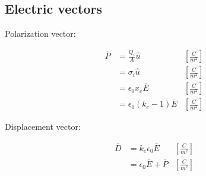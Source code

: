 \documentclass[letterpaper]{article}
\newcommand{\divline}{\noindent\makebox[\linewidth]{\rule{\textwidth}{0.4pt}}}
\begin{document}
    \divline
    \begin{multicols}{2}
        \section{Electric vectors}

        Polarization vector:

        \begin{align*}
            \overline{P} &= \frac{Q_{i}}{A} \hat{u} &\left[ \frac{C}{m^{2}} \right] \\
                &= \sigma_{i} \hat{u} &\left[ \frac{C}{m^{2}} \right] \\
                &= \epsilon_{0} x_{e} \overline{E} &\left[ \frac{C}{m^{2}} \right] \\
                &= \epsilon_{0}(k_{e} - 1) \overline{E} &\left[ \frac{C}{m^{2}} \right]
        \end{align*}

        Displacement vector:

        \begin{align*}
            \overline{D} &= k_{e} \epsilon_{0} \overline{E} &\left[ \frac{C}{m^{2}} \right] \\
                &= \epsilon_{0} \overline{E} + \overline{P} &\left[ \frac{C}{m^{2}} \right]
        \end{align*}
    \end{multicols}
\end{document}

